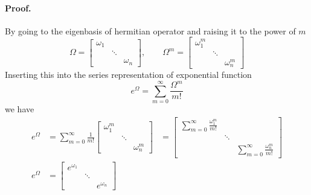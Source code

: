 \documentclass[../main.tex]{subfiles}
\begin{document}
\paragraph*{Proof.}
By going to the eigenbasis of hermitian operator and raising it to the power of $m$
\begin{equation*}
	\Omega=
	\begin{bmatrix}
		\omega_1 &        &          \\
		         & \ddots &          \\
		         &        & \omega_n
	\end{bmatrix},
	\qquad
	\Omega^m=
	\begin{bmatrix}
		\omega_1^m &        &            \\
		           & \ddots &            \\
		           &        & \omega_n^m
	\end{bmatrix}
\end{equation*}
Inserting this into the series representation of exponential function
\begin{equation*}
	e^\Omega=\sum_{m=0}^{\infty}\frac{\Omega^m}{m!}
\end{equation*}
we have
\begin{align*}
	e^\Omega & =\sum_{m=0}^{\infty}\frac{1}{m!}
	\begin{bmatrix}
		\omega_1^m &        &            \\
		           & \ddots &            \\
		           &        & \omega_n^m
	\end{bmatrix}
	         & =
	\begin{bmatrix}
		\sum_{m=0}^{\infty}\frac{\omega_1^m }{m!} &        &                                          \\
		                                          & \ddots &                                          \\
		                                          &        & \sum_{m=0}^{\infty}\frac{\omega_n^m}{m!}
	\end{bmatrix} \\
	e^\Omega & =
	\begin{bmatrix}
		e^{\omega_1} &        &              \\
		             & \ddots &              \\
		             &        & e^{\omega_n}
	\end{bmatrix}
\end{align*}
\end{document}
